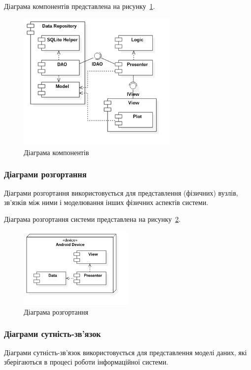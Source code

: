 Діаграма компонентів представлена на рисунку~\ref{fig:uml_component}.

\begin{figure}[H]
  \centering
    \includegraphics[width=0.7\textwidth]{uml_component}
  \caption{Діаграма компонентів}
  \label{fig:uml_component}
\end{figure}

\subsubsection{Діаграми розгортання}
Діаграми розгортання використовується для представлення (фізичних) вузлів, зв'язків між ними і моделювання інших фізичних аспектів системи.

Діаграма розгортання системи представлена на рисунку~\ref{fig:uml_deployment}.

\begin{figure}[H]
  \centering
    \includegraphics[width=0.5\textwidth]{uml_deployment}
  \caption{Діаграма розгортання}
  \label{fig:uml_deployment}
\end{figure}

\subsubsection{Діаграми сутність-зв’язок}
Діаграми сутність-зв’язок використовується для представлення моделі даних, які зберігаються в процесі роботи інформаційної системи.

